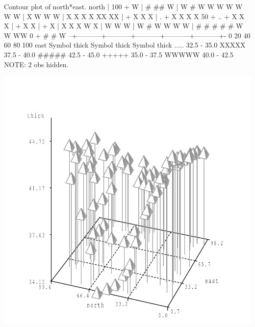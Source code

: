 \documentclass{article}
\begin{document}
\begin{Woutput}
                     Contour plot of north*east.
north |
  100 +                                                      W
      |               #  ##              W
      |  W            #  W      W   W  W          W          W    W
      |    X                   W            W    W
      |         X      X      X         X                  XX   XX
      |     +       X   X                                  X
      | .               +                               X   X  X   X
   50 +    ..            +                               X    X X
      |      +              X                          X
      |     +                           X
      |         X      X     X               W     X
      |                        W      W                W
      |                W  #                   W    W       W W
      |            #      #  #    # #                  W  W  WW
    0 +         #                         #                  W
      --+-----------+-----------+-----------+-----------+-----------+-
        0          20          40          60          80          100
                                    east
 Symbol        thick     Symbol        thick     Symbol        thick
 .....   32.5 - 35.0     XXXXX   37.5 - 40.0     #####   42.5 - 45.0
 +++++   35.0 - 37.5     WWWWW   40.0 - 42.5
NOTE: 2 obs hidden.
\end{Woutput}
\includegraphics[]{thick-1-SAS-fig.pdf}
\end{document}
